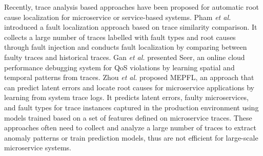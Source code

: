 Recently, trace analysis based approaches have been proposed for automatic root cause localization for microservice or service-based systems.
Pham \emph{et al.}\cite{Cuong_traceBased} introduced a fault localization approach based on trace similarity comparison. It collects a large number of traces labelled with fault types and root causes through fault injection and conducts fault localization by comparing between faulty traces and historical traces.
Gan \emph{et al.}\cite{19ICASPLOS_Seer} presented Seer, an online cloud performance debugging system for QoS violations by learning spatial and temporal patterns from traces.
Zhou \emph{et al.}\cite{FSE2019LatentError} proposed MEPFL, an approach that can predict latent errors and locate root causes for microservice applications by learning from system trace logs.
It predicts latent errors, faulty microservices, and fault types for trace instances captured in the production environment using models trained based on a set of features defined on microservice traces.
These approaches often need to collect and analyze a large number of traces to extract anomaly patterns or train prediction models, thus are not efficient for large-scale microservice systems.

